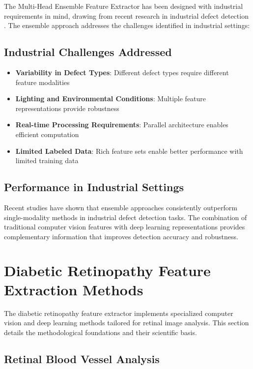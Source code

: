 \documentclass[12pt,a4paper]{article}
\begin{document}
The Multi-Head Ensemble Feature Extractor has been designed with industrial requirements in mind, drawing from recent research in industrial defect detection \cite{tabernik2020segmentation,wei2020surface,luo2021machine}. The ensemble approach addresses the challenges identified in industrial settings:

\subsection{Industrial Challenges Addressed}

\begin{itemize}
    \item \textbf{Variability in Defect Types}: Different defect types require different feature modalities
    \item \textbf{Lighting and Environmental Conditions}: Multiple feature representations provide robustness
    \item \textbf{Real-time Processing Requirements}: Parallel architecture enables efficient computation
    \item \textbf{Limited Labeled Data}: Rich feature sets enable better performance with limited training data
\end{itemize}

\subsection{Performance in Industrial Settings}

Recent studies \cite{luo2021machine} have shown that ensemble approaches consistently outperform single-modality methods in industrial defect detection tasks. The combination of traditional computer vision features with deep learning representations provides complementary information that improves detection accuracy and robustness.

\section{Diabetic Retinopathy Feature Extraction Methods}

The diabetic retinopathy feature extractor implements specialized computer vision and deep learning methods tailored for retinal image analysis. This section details the methodological foundations and their scientific basis.

\subsection{Retinal Blood Vessel Analysis}
\end{document}
